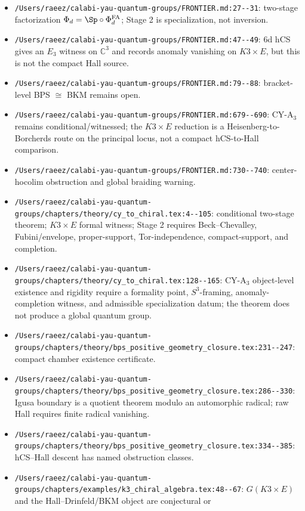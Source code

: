 \begin{itemize}
\item \verb|/Users/raeez/calabi-yau-quantum-groups/FRONTIER.md:27--31|:
two-stage factorization \(\Phi_d=\Sp\circ\PhiFA_d\); Stage 2 is
specialization, not inversion.
\item \verb|/Users/raeez/calabi-yau-quantum-groups/FRONTIER.md:47--49|:
6d hCS gives an \(E_3\) witness on \(\mathbb C^3\) and records anomaly
vanishing on \(K3\times E\), but this is not the compact Hall source.
\item \verb|/Users/raeez/calabi-yau-quantum-groups/FRONTIER.md:79--88|:
bracket-level BPS \(\cong\) BKM remains open.
\item \verb|/Users/raeez/calabi-yau-quantum-groups/FRONTIER.md:679--690|:
CY-A\(_3\) remains conditional/witnessed; the \(K3\times E\) reduction is
a Heisenberg-to-Borcherds route on the principal locus, not a compact
hCS-to-Hall comparison.
\item \verb|/Users/raeez/calabi-yau-quantum-groups/FRONTIER.md:730--740|:
center-hocolim obstruction and global braiding warning.
\item \verb|/Users/raeez/calabi-yau-quantum-groups/chapters/theory/cy_to_chiral.tex:4--105|:
conditional two-stage theorem; \(K3\times E\) formal witness; Stage 2
requires Beck--Chevalley, Fubini/envelope, proper-support,
Tor-independence, compact-support, and completion.
\item \verb|/Users/raeez/calabi-yau-quantum-groups/chapters/theory/cy_to_chiral.tex:128--165|:
CY-A\(_3\) object-level existence and rigidity require a formality point,
\(S^3\)-framing, anomaly-completion witness, and admissible specialization
datum; the theorem does not produce a global quantum group.
\item \verb|/Users/raeez/calabi-yau-quantum-groups/chapters/theory/bps_positive_geometry_closure.tex:231--247|:
compact chamber existence certificate.
\item \verb|/Users/raeez/calabi-yau-quantum-groups/chapters/theory/bps_positive_geometry_closure.tex:286--330|:
Igusa boundary is a quotient theorem modulo an automorphic radical; raw
Hall requires finite radical vanishing.
\item \verb|/Users/raeez/calabi-yau-quantum-groups/chapters/theory/bps_positive_geometry_closure.tex:334--385|:
hCS--Hall descent has named obstruction classes.
\item \verb|/Users/raeez/calabi-yau-quantum-groups/chapters/examples/k3_chiral_algebra.tex:48--67|:
\(G(K3\times E)\) and the Hall--Drinfeld/BKM object are conjectural or

\end{itemize}

